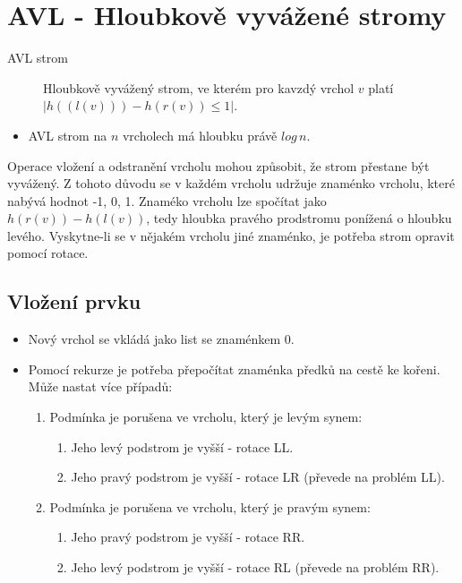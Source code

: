 \section{AVL - Hloubkově vyvážené stromy}
  \begin{description}
    \item[AVL strom] Hloubkově vyvážený strom, ve kterém pro kavzdý vrchol $v$ platí $|h((l(v))) - h(r(v)) \leq 1|$.
  \end{description}

  \begin{itemize}
    \item AVL strom na $n$ vrcholech má hloubku právě $log \, n$.
  \end{itemize}

  Operace vložení a odstranění vrcholu mohou způsobit, že strom přestane být vyvážený.
  Z tohoto důvodu se v každém vrcholu udržuje znaménko vrcholu, které nabývá hodnot {-1, 0, 1}.
  Znaméko vrcholu lze spočítat jako $h(r(v)) - h(l(v))$, tedy hloubka pravého prodstromu ponížená o hloubku levého.
  Vyskytne-li se v nějakém vrcholu jiné znaménko, je potřeba strom opravit pomocí rotace.

  \subsection{Vložení prvku}
    \begin{itemize}
      \item Nový vrchol se vkládá jako list se znaménkem 0.
      \item Pomocí rekurze je potřeba přepočítat znaménka předků na cestě ke kořeni. Může nastat více případů:
        \begin{enumerate}
          \item Podmínka je porušena ve vrcholu, který je levým synem:
            \begin{enumerate}
              \item Jeho levý podstrom je vyšší - rotace LL.
              \item Jeho pravý podstrom je vyšší - rotace LR (převede na problém LL).
            \end{enumerate}
          \item Podmínka je porušena ve vrcholu, který je pravým synem:
            \begin{enumerate}
              \item Jeho pravý podstrom je vyšší - rotace RR.
              \item Jeho levý podstrom je vyšší - rotace RL (převede na problém RR).
            \end{enumerate}
        \end{enumerate}
    \end{itemize}

